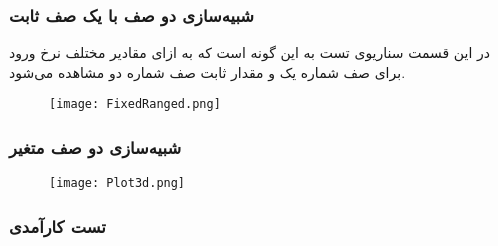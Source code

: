\subsubsection{شبیه‌سازی دو صف با یک صف ثابت}
در این قسمت سناریوی تست به این گونه است که به ازای مقادیر مختلف نرخ ورود برای صف شماره یک و مقدار ثابت صف شماره دو مشاهده می‌شود.
\begin{figure}[H]
	\texttt{[image: FixedRanged.png]}
\end{figure}
\newpage
\subsubsection{شبیه‌سازی دو صف متغیر}
\begin{figure}[H]
	\texttt{[image: Plot3d.png]}
\end{figure}
\newpage
\subsubsection{تست کارآمدی}
\begin{table}[H]
	\centering
	\begin{latin}		
	\end{latin}
\end{table}
\clearpage
